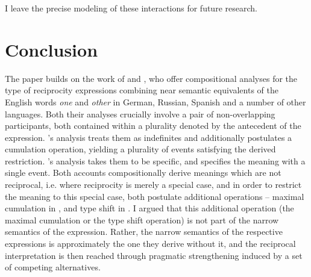 \documentclass[output=paper,colorlinks,citecolor=brown]{langscibook}
\begin{document}
\noindent I leave the precise modeling of these interactions for future research.

\section{Conclusion}\label{sec:arsenijevic:concl}

The paper builds on the work of \citet{v10} and \citet{z14}, who offer compositional analyses for the type of reciprocity expressions combining near semantic equivalents of the English words \textit{one} and \textit{other} in German, Russian, Spanish and a number of other languages. Both their analyses crucially involve a pair of non-overlapping participants, both contained within a plurality denoted by the antecedent of the expression. \citeauthor{v10}'s analysis treats them as indefinites and additionally postulates a cumulation operation, yielding a plurality of events satisfying the derived restriction. \citeauthor{z14}'s analysis takes them to be specific, and specifies the meaning with a single event. Both accounts compositionally derive meanings which are not reciprocal, i.e. where reciprocity is merely a special case, and in order to restrict the meaning to this special case, both postulate additional operations -- maximal cumulation in \citeauthor{v10}, and type shift in \citeauthor{z14}. I argued that this additional operation (the maximal cumulation or the type shift operation) is not part of the narrow semantics of the expression. Rather, the narrow semantics of the respective expressions is approximately the one they derive without it, and the reciprocal interpretation is then reached through pragmatic strengthening induced by a set of competing alternatives. 
\end{document}
